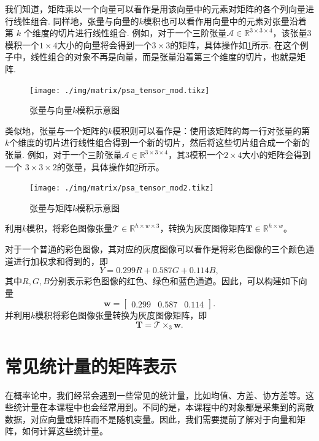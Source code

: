 我们知道，矩阵乘以一个向量可以看作是用该向量中的元素对矩阵的各个列向量进行线性组合. 同样地，张量与向量的$k$模积也可以看作用向量中的元素对张量沿着第 $k$ 个维度的切片进行线性组合. 例如，对于一个三阶张量$\mathcal A \in \mathbb {R}^{3 \times 3 \times 4 }$，该张量3模积一个$1\times 4$大小的向量将会得到一个\( 3 \times 3 \)的矩阵，具体操作如\cref{fig.psa.nmod_example}所示. 在这个例子中，线性组合的对象不再是向量，而是张量沿着第三个维度的切片，也就是矩阵.
\begin{figure}[htb!]
    \centering
    \texttt{[image: ./img/matrix/psa\_tensor\_mod.tikz]}
    \caption{张量与向量$k$模积示意图}
    \label{fig.psa.nmod_example}
\end{figure}

类似地，张量与一个矩阵的$k$模积则可以看作是：使用该矩阵的每一行对张量的第$k$个维度的切片进行线性组合得到一个新的切片，然后将这些切片组合成一个新的张量. 例如，对于一个三阶张量$\mathcal A \in \mathbb {R}^{3 \times 3 \times 4 }$，其3模积一个$2\times 4$大小的矩阵会得到一个 \( 3 \times 3 \times 2 \)的张量，具体操作如\cref{fig.psa.nmod_example2}所示。
\begin{figure}[htb!]
    \centering
    \texttt{[image: ./img/matrix/psa\_tensor\_mod2.tikz]}
    \caption{张量与矩阵$k$模积示意图}
    \label{fig.psa.nmod_example2}
\end{figure}

\begin{example}
    利用\( k \)模积，将彩色图像张量\( \mathcal{T} \in \mathbb{R}^{h \times w \times 3} \)，转换为灰度图像矩阵\( \mathbf{T} \in \mathbb{R}^{h \times w} \)。
\end{example}
\begin{solution}
    对于一个普通的彩色图像，其对应的灰度图像可以看作是将彩色图像的三个颜色通道进行加权求和得到的，即
    \[
        Y = 0.299 R + 0.587 G + 0.114 B,
    \]
    其中\( R, G, B \)分别表示彩色图像的红色、绿色和蓝色通道。因此，可以构建如下向量
    \[
        \bm{w} = \begin{bmatrix} 0.299 & 0.587 & 0.114 \end{bmatrix}.
    \]
    并利用\( k \)模积将彩色图像张量转换为灰度图像矩阵，即
    \[
        \mathbf{T} = \mathcal{T} \times_3 \bm{w}.
    \]
\end{solution}

\section{常见统计量的矩阵表示}

在概率论中，我们经常会遇到一些常见的统计量，比如均值、方差、协方差等。这些统计量在本课程中也会经常用到。不同的是，本课程中的对象都是采集到的离散数据，对应向量或矩阵而不是随机变量。因此，我们需要提前了解对于向量和矩阵，如何计算这些统计量。


